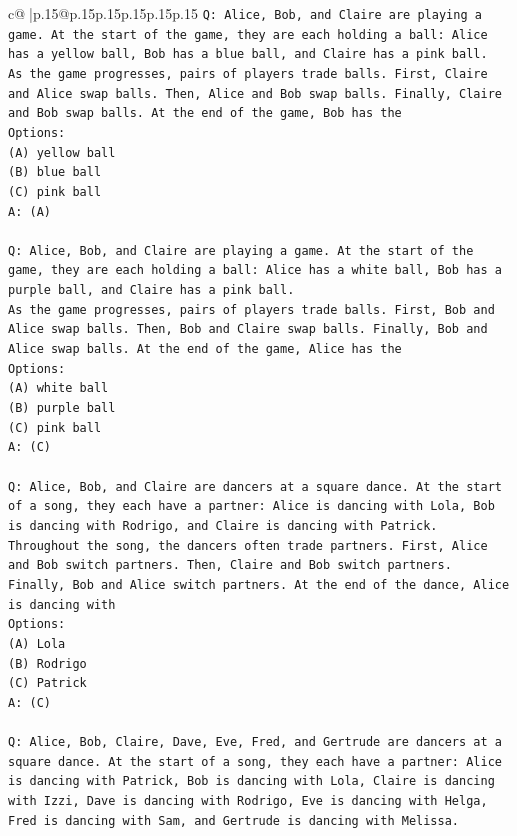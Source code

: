 \documentclass{article}
\begin{document}
{\begin{supertabular}{c@{$\;$}|p{.15\linewidth}@{}p{.15\linewidth}p{.15\linewidth}p{.15\linewidth}p{.15\linewidth}p{.15\linewidth}}
{{{\texttt{Q: Alice, Bob, and Claire are playing a game. At the start of the game, they are each holding a ball: Alice has a yellow ball, Bob has a blue ball, and Claire has a pink ball.} \\
\texttt{As the game progresses, pairs of players trade balls. First, Claire and Alice swap balls. Then, Alice and Bob swap balls. Finally, Claire and Bob swap balls. At the end of the game, Bob has the} \\
\texttt{Options:} \\
\texttt{(A) yellow ball} \\
\texttt{(B) blue ball} \\
\texttt{(C) pink ball} \\
\texttt{A: (A)} \\
\\ 
\texttt{Q: Alice, Bob, and Claire are playing a game. At the start of the game, they are each holding a ball: Alice has a white ball, Bob has a purple ball, and Claire has a pink ball.} \\
\texttt{As the game progresses, pairs of players trade balls. First, Bob and Alice swap balls. Then, Bob and Claire swap balls. Finally, Bob and Alice swap balls. At the end of the game, Alice has the} \\
\texttt{Options:} \\
\texttt{(A) white ball} \\
\texttt{(B) purple ball} \\
\texttt{(C) pink ball} \\
\texttt{A: (C)} \\
\\ 
\texttt{Q: Alice, Bob, and Claire are dancers at a square dance. At the start of a song, they each have a partner: Alice is dancing with Lola, Bob is dancing with Rodrigo, and Claire is dancing with Patrick.} \\
\texttt{Throughout the song, the dancers often trade partners. First, Alice and Bob switch partners. Then, Claire and Bob switch partners. Finally, Bob and Alice switch partners. At the end of the dance, Alice is dancing with} \\
\texttt{Options:} \\
\texttt{(A) Lola} \\
\texttt{(B) Rodrigo} \\
\texttt{(C) Patrick} \\
\texttt{A: (C)} \\
\\ 
\texttt{Q: Alice, Bob, Claire, Dave, Eve, Fred, and Gertrude are dancers at a square dance. At the start of a song, they each have a partner: Alice is dancing with Patrick, Bob is dancing with Lola, Claire is dancing with Izzi, Dave is dancing with Rodrigo, Eve is dancing with Helga, Fred is dancing with Sam, and Gertrude is dancing with Melissa.} \\
}}}
\end{supertabular}}
\end{document}
